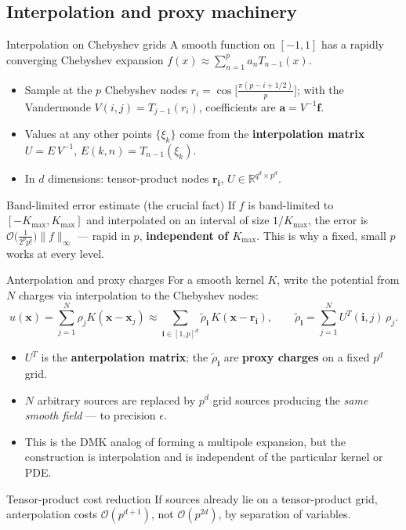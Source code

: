 \documentclass[aspectratio=169,11pt]{beamer}
\newcommand{\R}{\mathbb{R}}
\newcommand{\cO}{\mathcal{O}}
\newcommand{\x}{\bm{x}}
\newcommand{\rr}{\bm{r}}
\newcommand{\hl}[1]{{\color{CCMorange}\textbf{#1}}}
\begin{document}
\subsection{Interpolation and proxy machinery}

\begin{frame}{Interpolation on Chebyshev grids}
\small
A smooth function on \([-1,1]\) has a rapidly converging Chebyshev expansion
\(f(x)\approx\sum_{n=1}^p a_n T_{n-1}(x)\).
\begin{itemize}
  \item Sample at the \(p\) Chebyshev nodes \(r_i=\cos\!\big[\tfrac{\pi(p-i+1/2)}{p}\big]\); with the Vandermonde \(V(i,j)=T_{j-1}(r_i)\), coefficients are \(\bm a=V^{-1}\bm f\).
  \item Values at any other points \(\{\xi_k\}\) come from the \hl{interpolation matrix} \(U=E\,V^{-1}\), \(E(k,n)=T_{n-1}(\xi_k)\).
  \item In \(d\) dimensions: tensor-product nodes \(\rr_{\bm i}\), \(U\in\R^{q^d\times p^d}\).
\end{itemize}
\begin{block}{Band-limited error estimate (the crucial fact)}
If \(f\) is band-limited to \([-K_{\max},K_{\max}]\) and interpolated on an interval of size \(1/K_{\max}\), the error is
\(\displaystyle \cO\!\Big(\tfrac{1}{2^p p!}\Big)\|f\|_\infty\) --- rapid in \(p\), \hl{independent of \(K_{\max}\)}. This is why a fixed, small \(p\) works at every level.
\end{block}
\end{frame}

\begin{frame}{Anterpolation and proxy charges}
\small
For a smooth kernel \(K\), write the potential from \(N\) charges via interpolation to the Chebyshev nodes:
\[
  u(\x)=\sum_{j=1}^N \rho_j K(\x-\x_j)\approx\sum_{\bm i\in[1,p]^d}\tilde\rho_{\bm i}\,K(\x-\rr_{\bm i}),
  \qquad
  \tilde\rho_{\bm i}=\sum_{j=1}^N U^T(\bm i,j)\,\rho_j .
\]
\begin{itemize}
  \item \(U^T\) is the \hl{anterpolation matrix}; the \(\tilde\rho_{\bm i}\) are \hl{proxy charges} on a fixed \(p^d\) grid.
  \item \(N\) arbitrary sources are replaced by \(p^d\) grid sources producing the \emph{same smooth field} --- to precision \(\epsilon\).
  \item This is the DMK analog of forming a multipole expansion, but the
  construction is interpolation and is independent of the particular kernel or
  PDE.
\end{itemize}
\begin{block}{Tensor-product cost reduction}
If sources already lie on a tensor-product grid, anterpolation costs \(\cO(p^{d+1})\), not \(\cO(p^{2d})\), by separation of variables.
\end{block}
\end{frame}
\end{document}
